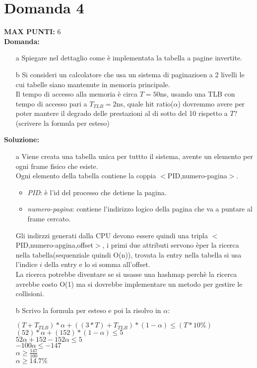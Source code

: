 \documentclass{article}
\begin{document}
   \section*{Domanda 4}
   \textbf{MAX PUNTI:} 6\\
   \textbf{Domanda:}
   \begin{itemize}
      \item[a] Spiegare nel dettaglio come è implementata la tabella a pagine invertite.
      \item[b] Si consideri un calcolatore che usa un sistema di paginazioen a 2 livelli le cui tabelle siano mantenute in memoria principale.\\
         Il tempo di accesso alla memoria è circa $T=50$ns, usando una TLB con tempo di accesso pari a $T_{TLB}=2$ns, quale hit ratio($\alpha$) dovremmo avere per poter mantere il degrado delle prestazioni al di sotto del 10\text{\%} rispetto a $T$?(scrivere la formula per esteso) 
   \end{itemize}
   \textbf{Soluzione:}
   \begin{enumerate}
      \item[a] Viene creata una tabella unica per tuttto il sistema, avente un elemento per ogni frame fisico che esiste.\\
         Ogni elemento della tabella contiene la coppia $<$PID,numero-pagina$>$.
         \begin{itemize}
            \item \emph{PID}: è l'id del processo che detiene la pagina.
            \item \emph{numero-pagina}: contiene l'indirizzo logico della pagina che va a puntare al frame cercato.
         \end{itemize}
         Gli indirzzi generati dalla CPU devono essere quindi una tripla $<$PID,numero-apgina,offset$>$, i primi due attributi servono èper la ricerca nella tabella(sequenziale quindi O(n)), trovata la entry nella tabella si usa l'indice $i$ della entry e lo si somma all'offset.\\
         La ricerca potrebbe diventare se si usasse una hashmap perchè la ricerca avrebbe costo O(1) ma si dovrebbe implementare un metodo per gestire le collisioni.
      \item[b] Scrivo la formula per esteso e poi la risolvo in $\alpha$:
         \begin{center}
            $(T+T_{TLB})*\alpha+((3*T)+T_{TLB})*(1-\alpha) \le (T*10\%)$\\
            $(52)*\alpha+(152)*(1-\alpha) \le 5$\\
            $52\alpha+152-152\alpha \le 5$\\
            $-100\alpha \le -147$\\
            $\alpha \ge \frac{147}{100}$\\
            $\alpha \ge 14.7\%$
         \end{center}
   \end{enumerate}
\end{document}
